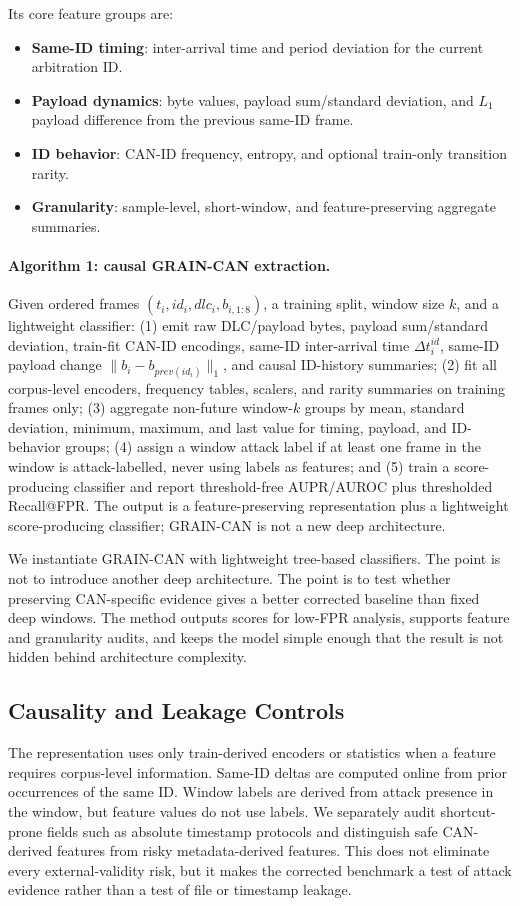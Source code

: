 \documentclass[runningheads]{llncs}%
\newcommand{\method}{GRAIN-CAN}
\begin{document}
Its core feature groups are:
\begin{itemize}
    \item \textbf{Same-ID timing}: inter-arrival time and period deviation for the current arbitration ID.
    \item \textbf{Payload dynamics}: byte values, payload sum/standard deviation, and $L_1$ payload difference from the previous same-ID frame.
    \item \textbf{ID behavior}: CAN-ID frequency, entropy, and optional train-only transition rarity.
    \item \textbf{Granularity}: sample-level, short-window, and feature-preserving aggregate summaries.
\end{itemize}


\paragraph{Algorithm 1: causal GRAIN-CAN extraction.}
Given ordered frames $(t_i,id_i,dlc_i,b_{i,1:8})$, a training split, window size $k$, and a lightweight classifier: (1) emit raw DLC/payload bytes, payload sum/standard deviation, train-fit CAN-ID encodings, same-ID inter-arrival time $\Delta t^{id}_i$, same-ID payload change $\|b_i-b_{prev(id_i)}\|_1$, and causal ID-history summaries; (2) fit all corpus-level encoders, frequency tables, scalers, and rarity summaries on training frames only; (3) aggregate non-future window-$k$ groups by mean, standard deviation, minimum, maximum, and last value for timing, payload, and ID-behavior groups; (4) assign a window attack label if at least one frame in the window is attack-labelled, never using labels as features; and (5) train a score-producing classifier and report threshold-free AUPR/AUROC plus thresholded Recall@FPR.  The output is a feature-preserving representation plus a lightweight score-producing classifier; \method{} is not a new deep architecture.

We instantiate \method{} with lightweight tree-based classifiers.  The point is not to introduce another deep architecture.  The point is to test whether preserving CAN-specific evidence gives a better corrected baseline than fixed deep windows.  The method outputs scores for low-FPR analysis, supports feature and granularity audits, and keeps the model simple enough that the result is not hidden behind architecture complexity.

\subsection{Causality and Leakage Controls}
The representation uses only train-derived encoders or statistics when a feature requires corpus-level information.  Same-ID deltas are computed online from prior occurrences of the same ID.  Window labels are derived from attack presence in the window, but feature values do not use labels.  We separately audit shortcut-prone fields such as absolute timestamp protocols and distinguish safe CAN-derived features from risky metadata-derived features.  This does not eliminate every external-validity risk, but it makes the corrected benchmark a test of attack evidence rather than a test of file or timestamp leakage.
\end{document}
